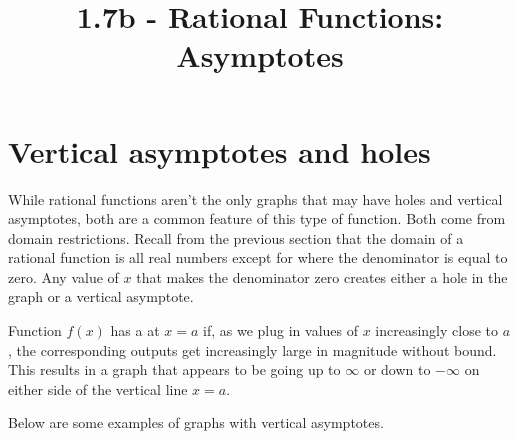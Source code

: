 \documentclass{ximera}
\title{1.7b - Rational Functions: Asymptotes}
\begin{document}
\begin{abstract} \end{abstract}
\maketitle


\section{Vertical asymptotes and holes}
While rational functions aren't the only graphs that may have holes and vertical asymptotes, both are a common feature of this type of function. Both come from domain restrictions. Recall from the previous section that the domain of a rational function is all real numbers except for where the denominator is equal to zero. Any value of $x$ that makes the denominator zero creates either a hole in the graph or a vertical asymptote.

\begin{definition}
  Function $f(x)$ has a  at $x=a$ if, as we plug in values of $x$ increasingly close to $a$, the corresponding outputs get increasingly large in magnitude without bound. This results in a graph that appears to be going up to $\infty$ or down to $-\infty$ on either side of the vertical line $x=a$.
\end{definition}

Below are some examples of graphs with vertical asymptotes. 

 \hfill
{}\hfill
{}
\vspace{-.1in}
\end{document}
